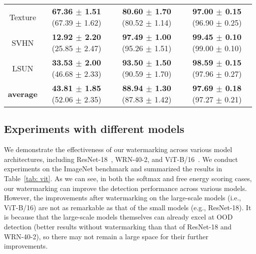 \documentclass{article}
\begin{document}
\begin{table}[t]
{\begin{tabular}{c|ccc}
Texture            & \textbf{67.36 $\pm$ 1.51} (67.39 $\pm$ 1.62) & \textbf{80.60 $\pm$ 1.70} (80.52 $\pm$ 1.14) & \textbf{97.00 $\pm$ 0.15} (96.90 $\pm$ 0.25) \\
SVHN               & \textbf{12.92 $\pm$ 2.20} (25.85 $\pm$ 2.47) & \textbf{97.49 $\pm$ 1.00} (95.26 $\pm$ 1.51) & \textbf{99.45 $\pm$ 0.10} (99.00 $\pm$ 0.10) \\
LSUN             & \textbf{33.53 $\pm$ 2.00} (46.68 $\pm$ 2.33) & \textbf{93.50 $\pm$ 1.50} (90.59 $\pm$ 1.70) & \textbf{98.59 $\pm$ 0.15} (97.96 $\pm$ 0.27) \\
\midrule
\textbf{average}   & \textbf{43.81 $\pm$ 1.85} (52.06 $\pm$ 2.35) & \textbf{88.94 $\pm$ 1.30} (87.83 $\pm$ 1.42) & \textbf{97.69 $\pm$ 0.18} (97.27 $\pm$ 0.21) \\ \bottomrule[1.5pt]      
\end{tabular}
}
\end{table}











\subsection{Experiments with different models}

{We demonstrate the effectiveness of our watermarking across various model architectures, including ResNet-18~\cite{he2016deep}, WRN-40-2, and ViT-B/16~\cite{DosovitskiyB0WZ21}. We conduct experiments on the ImageNet benchmark and summarized the results in Table~\ref{tab: vit}. As we can see, in both the softmax and free energy scoring cases, our watermarking can improve the detection performance across various models. However, the improvements after watermarking on the large-scale models (i.e., ViT-B/16) are not as remarkable as that of the small models (e.g., ResNet-18). It is because that the large-scale models themselves can already excel at OOD detection (better results without watermarking than that of ResNet-18 and WRN-40-2), so there may not remain a large space for their further improvements. }
\end{document}
